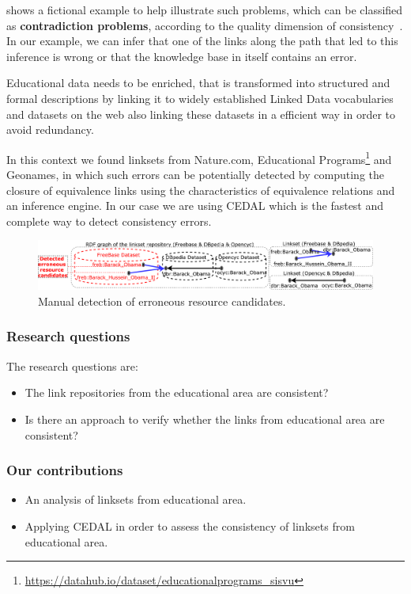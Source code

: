  shows a fictional example to help illustrate such problems, which can be classified as \textbf{contradiction problems}, according to the quality dimension of consistency~\cite{zaveri2015quality}. 
In our example, we can infer that one of the links along the path that led to this inference is wrong or that the knowledge base in itself contains an error. 

Educational data needs to be enriched, that is transformed into structured and formal descriptions by linking it to widely established Linked Data vocabularies and datasets on the web also linking these datasets in a efficient way in order to avoid redundancy.

In this context we found linksets from Nature.com, Educational Programs\footnote{\url{https://datahub.io/dataset/educationalprograms_sisvu}} and Geonames, in which such errors can be potentially detected by computing the closure of equivalence links using the characteristics of equivalence relations and an inference engine. In our case we are using CEDAL \cite{cedal2017} which is the fastest and complete way to detect consistency errors. 

\begin{figure}[htb] 
	\centering
	\includegraphics[width=1.0\linewidth]{img/example8.pdf}
	\caption{Manual detection of erroneous resource candidates.}
	\label{fig:example}
\end{figure} 

\subsubsection{Research questions}

The research questions are:
\begin{itemize}
    \item The link repositories from the educational area are consistent?
    \item Is there an approach to verify whether the links from educational area are consistent?
\end{itemize}


\subsubsection{Our contributions}
\begin{itemize}
    \item An analysis of linksets from educational area.
    \item Applying CEDAL\cite{valdestilhas2017cedal} in order to assess the consistency of linksets from educational area.
\end{itemize}

